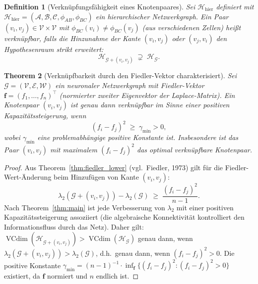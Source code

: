 \documentclass[12pt, a4paper, openany]{report}
\newtheorem{theorem}{Theorem}[chapter]
\newtheorem{definition}[theorem]{Definition}
\newcommand{\calG}{\mathcal{G}}
\newcommand{\calH}{\mathcal{H}}
\newcommand{\calV}{\mathcal{V}}
\newcommand{\calE}{\mathcal{E}}
\newcommand{\calW}{\mathcal{W}}
\newcommand{\calA}{\mathcal{A}}
\newcommand{\calB}{\mathcal{B}}
\newcommand{\calC}{\mathcal{C}}
\DeclareMathOperator{\VC}{VCdim}
\begin{document}
\begin{definition}[Verknüpfungsfähigkeit eines Knotenpaares]
\label{def:linkability}
Sei $\calH_{\mathrm{hier}}$ definiert mit $\calH_{\mathrm{hier}} = (\calA, \calB, \calC, \phi_{AB}, \phi_{BC})$
ein hierarchischer Netzwerkgraph.  Ein Paar $(v_i, v_j) \in \calV \times \calV$
mit $\phi_{BC}(v_i) \neq \phi_{BC}(v_j)$ (aus verschiedenen Zellen) heißt
\emph{verknüpfbar}, falls die Hinzunahme der Kante $(v_i, v_j)$ oder
$(v_j, v_i)$ den Hypothesenraum strikt erweitert:
\[
  \calH_{\calG + (v_i, v_j)} \;\supsetneq\; \calH_{\calG}.
\]
\end{definition}

\begin{theorem}[Verknüpfbarkeit durch den Fiedler-Vektor charakterisiert]
\label{thm:linkability_fiedler}
Sei $\calG = (\calV, \calE, \calW)$ ein neuronaler Netzwerkgraph mit
Fiedler-Vektor $\bm{f} = (f_1, \ldots, f_n)^\top$ (normierter zweiter
Eigenvektor der Laplace-Matrix).  Ein Knotenpaar $(v_i, v_j)$ ist genau
dann verknüpfbar im Sinne einer positiven Kapazitätssteigerung, wenn
\begin{equation}
  \label{eq:linkability_fiedler}
  (f_i - f_j)^2 \;\geq\; \gamma_{\min} > 0,
\end{equation}
wobei $\gamma_{\min}$ eine problemabhängige positive Konstante ist.
Insbesondere ist das Paar $(v_i, v_j)$ mit maximalem $(f_i - f_j)^2$
das optimal verknüpfbare Knotenpaar.
\end{theorem}

\begin{proof}
Aus Theorem~\ref{thm:fiedler_lower} (vgl.\ Fiedler, 1973) gilt für die
Fiedler-Wert-Änderung beim Hinzufügen von Kante $(v_i, v_j)$:
\[
  \lambda_2(\calG + (v_i, v_j)) - \lambda_2(\calG)
  \;\geq\;
  \frac{(f_i - f_j)^2}{n - 1}.
\]
Nach Theorem~\ref{thm:main} ist jede Verbesserung von $\lambda_2$ mit einer
positiven Kapazitätssteigerung assoziiert (die algebraische Konnektivität
kontrolliert den Informationsfluss durch das Netz).  Daher gilt:
$\VC(\calH_{\calG + (v_i, v_j)}) > \VC(\calH_{\calG})$ genau dann, wenn
$\lambda_2(\calG + (v_i, v_j)) > \lambda_2(\calG)$, d.h.\ genau dann, wenn
$(f_i - f_j)^2 > 0$.  Die positive Konstante $\gamma_{\min} = (n-1)^{-1}
\cdot \inf_{\bm{f}} \{(f_i - f_j)^2 : (f_i - f_j)^2 > 0\}$ existiert, da
$\bm{f}$ normiert und $n$ endlich ist.
\end{proof}
\end{document}
